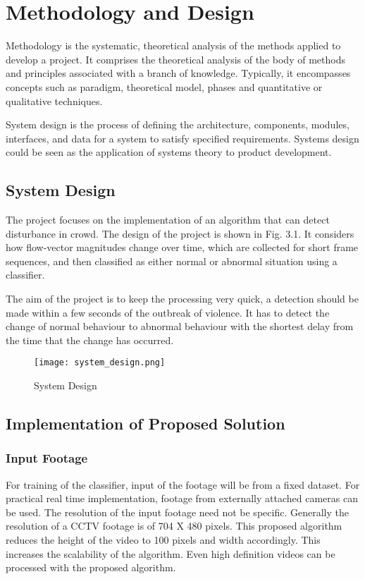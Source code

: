 \chapter{Methodology and Design}
Methodology is the systematic, theoretical analysis of the methods applied to develop a project. It comprises the theoretical analysis of the body of methods and principles associated with a branch of knowledge. Typically, it encompasses concepts such as paradigm, theoretical model, phases and quantitative or qualitative techniques.
\par
System design is the process of defining the architecture, components, modules, interfaces, and data for a system to satisfy specified requirements. Systems design could be seen as the application of systems theory to product development.
\section{System Design}
The project focuses on the implementation of an algorithm that can detect disturbance in crowd. The design of the project is shown in Fig. 3.1. It considers how flow-vector magnitudes change over time, which are collected for short frame sequences, and then classified as either normal or abnormal situation using a classifier.
\par
The aim of the project is to keep the processing very quick, a detection should be made within a few seconds of the outbreak of violence. It has to detect the change of normal behaviour to abnormal behaviour with the shortest delay from the time that the change has occurred.

\begin{figure}[H]
\centering
\texttt{[image: system\_design.png]}
\caption{System Design}
\end{figure}

\section{Implementation of Proposed Solution}
\subsection{Input Footage}
For training of the classifier, input of the footage will be from a fixed dataset. For practical real time implementation, footage from externally attached cameras can be used. The resolution of the input footage need not be specific. Generally the resolution of a CCTV footage is of 704 X 480 pixels. This proposed algorithm reduces the height of the video to 100 pixels and width accordingly. This increases the scalability of the algorithm. Even high definition videos can be processed with the proposed algorithm.
